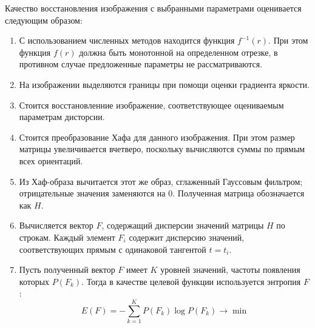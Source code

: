 Качество восстановления изображения с выбранными параметрами оценивается следующим образом:
\begin{enumerate}
\item
    С использованием численных методов находится функция $f^{-1}(r)$. При этом функция $f(r)$ должна быть монотонной на определенном отрезке, в противном случае предложенные параметры не рассматриваются.
\item
    На изображении выделяются границы при помощи оценки градиента яркости.
\item
    Стоится восстановленние изображение, соответствующее оцениваемым параметрам дисторсии.
\item
    Стоится преобразование Хафа для данного изображения. При этом размер матрицы увеличивается вчетверо, поскольку вычисляются суммы по прямым всех ориентаций.
\item
    Из Хаф-образа вычитается этот же образ, сглаженный Гауссовым фильтром; отрицательные значения заменяются на $0$. Полученная матрица обозначается как $H$.
\item
    Вычисляется вектор $F$, содержащий дисперсии значений матрицы $H$ по строкам. Каждый элемент $F_i$ содержит дисперсию значений, соответствующих прямым с одинаковой тангентой $t = t_i$.
\item
    Пусть полученный вектор $F$ имеет $K$ уровней значений, частоты появления которых $P(F_k)$. Тогда в качестве целевой функции используется энтропия $F$:
    \begin{equation*}
        E\left( F \right) =
        -\sum_{k=1}^{K} P(F_k) \log P(F_k)
        \to \min
    \end{equation*}
\end{enumerate}

